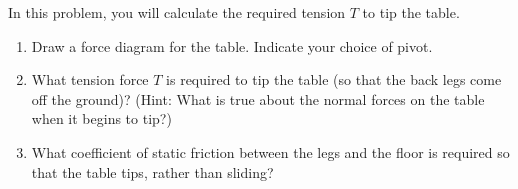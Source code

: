 \documentclass[12pt]{article}
\begin{document}
In this problem, you will calculate the required tension $T$ to tip the table.

\begin{enumerate}

\item Draw a force diagram for the table. Indicate your choice of pivot.

\newpage

\item What tension force $T$ is required to tip the table (so that the back legs come off the ground)?
(Hint: What is true about the normal forces on the table when it begins to tip?)

\vspace {4in}

\item What coefficient of static friction between the legs and the floor is
required so that the table tips, rather than sliding?

\end{enumerate}
 
\end{document}
